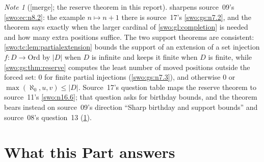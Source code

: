 \documentclass[11pt]{article}
\theoremstyle{definition}
\theoremstyle{remark}
\newtheorem{note}[note]{Note}
\newcommand{\Ord}{\mathrm{Ord}}
\newcommand{\card}[1]{\lvert #1\rvert}
\newcommand{\merge}{\textsf{[merge]}}
\begin{document}
\begin{note}[\merge; the reserve theorem in this report]\label{swo:viii:note:reserve}
 sharpens source~09's \cref{swo:ec:n8.2}: the
example $n\mapsto n+1$ there is source~17's \cref{swo:gs:n7.2}, and the
theorem says exactly when the larger cardinal of \cref{swo:gl:completion}
is needed and how many extra positions suffice. The two support theorems
are consistent: \cref{swo:tc:lem:partialextension} bounds the support of an
extension of a set injection $f:D\to\Ord$ by $\card D$ when $D$ is infinite
and keeps it finite when $D$ is finite, while \cref{swo:gs:thm:reserve}
computes the least number of moved positions outside the forced set: $0$ for
finite partial injections (\cref{swo:gs:n7.3}), and otherwise $0$ or
$\max(\aleph_0,u,v)\le\card D$. Source~17's
question table maps the reserve theorem to source~11's \cref{swo:n16.6};
that question asks for birthday bounds, and the theorem bears instead on
source~09's direction ``Sharp birthday and support bounds'' and source~08's
question~13 (\cref{swo:viii:sec:status}).
\end{note}

\section{What this Part answers}\label{swo:viii:sec:status}
\end{document}

